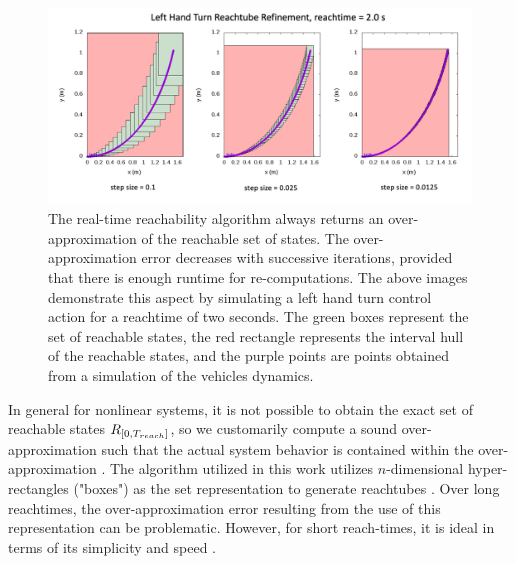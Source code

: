 \documentclass[manuscript,screen,review]{acmart}
\newcommand{\diego}[1]{\textcolor{purple}{\textbf{\underline{DM:}} #1}}
\begin{document}
\begin{figure}[htbp]%
  \centering
  \includegraphics[width=0.90\linewidth]{figures/refinement_cropped.pdf}
  \caption{The real-time reachability algorithm always returns an over-approximation of the reachable set of states. The over-approximation error decreases with successive iterations, provided that there is enough runtime for re-computations. The above images demonstrate this aspect by simulating a left hand turn control action for a reachtime of two seconds. The green boxes represent the set of reachable states, the red rectangle represents the interval hull of the reachable states, and the purple points are points obtained from a simulation of the vehicles dynamics.}
  \label{fig:reach_refine}
\end{figure}%
In general for nonlinear systems, it is not possible to obtain the exact set of reachable states $\mathnormal{R}_{[0,T_{reach}]}$, so we customarily compute a sound over-approximation such that the actual system behavior is contained within the over-approximation \cite{AlthoffNonlinear,Lin2020,Asarin2003}. The algorithm utilized in this work utilizes $n$-dimensional hyper-rectangles ("boxes") as the set representation to generate reachtubes \cite{Johnson2016}. Over long reachtimes, the over-approximation error resulting from the use of this representation can be problematic. However, for short reach-times, it is ideal in terms of its simplicity and speed \cite{Bak2014}. 
\end{document}

